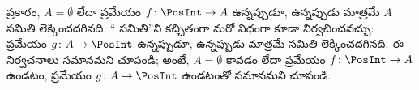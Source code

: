 \documentclass[../../../include/open-logic-section]{subfiles}
\begin{document}
\begin{prob}
   ప్రకారం, $A = \emptyset$
  లేదా  ప్రమేయం $f\colon \PosInt \to A$ ఉన్నప్పుడూ,
  ఉన్నప్పుడు మాత్రమే $A$ సమితి లెక్కించదగినది. `` సమితి''ని
  కచ్చితంగా మరో విధంగా కూడా నిర్వచించవచ్చు:  ప్రమేయం
  $g\colon A \to \PosInt$ ఉన్నప్పుడూ, ఉన్నప్పుడు మాత్రమే సమితి లెక్కించదగినది.
  ఈ నిర్వచనాలు సమానమని చూపండి; అంటే, $A = \emptyset$ కావడం లేదా
   ప్రమేయం $f\colon \PosInt \to A$ ఉండటం, 
  ప్రమేయం $g\colon A \to \PosInt$ ఉండటంతో సమానమని చూపండి.
\end{prob}
\end{document}
